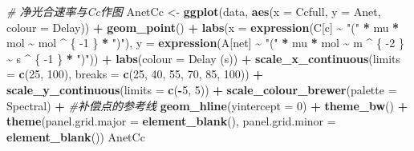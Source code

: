 \documentclass[
]{krantz}
\makeatletter
\newenvironment{Shaded}{\begin{snugshade}}{\end{snugshade}}
\newcommand{\CommentTok}[1]{\textcolor[rgb]{0.56,0.35,0.01}{\textit{#1}}}
\newcommand{\DataTypeTok}[1]{\textcolor[rgb]{0.13,0.29,0.53}{#1}}
\newcommand{\DecValTok}[1]{\textcolor[rgb]{0.00,0.00,0.81}{#1}}
\newcommand{\KeywordTok}[1]{\textcolor[rgb]{0.13,0.29,0.53}{\textbf{#1}}}
\newcommand{\NormalTok}[1]{#1}
\newcommand{\OperatorTok}[1]{\textcolor[rgb]{0.81,0.36,0.00}{\textbf{#1}}}
\newcommand{\StringTok}[1]{\textcolor[rgb]{0.31,0.60,0.02}{#1}}
\newenvironment{kframe}{%
\medskip{}
\setlength{\fboxsep}{.8em}
 \def\at@end@of@kframe{}%
 \ifinner\ifhmode%
  \def\at@end@of@kframe{\end{minipage}}%
  \begin{minipage}{\columnwidth}%
 \fi\fi%
 \def\FrameCommand##1{\hskip\@totalleftmargin \hskip-\fboxsep
 \colorbox{shadecolor}{##1}\hskip-\fboxsep
     \hskip-\linewidth \hskip-\@totalleftmargin \hskip\columnwidth}%
 \MakeFramed {\advance\hsize-\width
   \@totalleftmargin\z@ \linewidth\hsize
   \@setminipage}}%
 {\par\unskip\endMakeFramed%
 \at@end@of@kframe}
\renewenvironment{Shaded}{\begin{kframe}}{\end{kframe}}
\makeatother
\begin{document}
\begin{Shaded}
\begin{Highlighting}[]
\CommentTok{\# 净光合速率与Cc作图}
\NormalTok{AnetCc \textless{}{-}}\StringTok{ }\KeywordTok{ggplot}\NormalTok{(data, }\KeywordTok{aes}\NormalTok{(}\DataTypeTok{x =}\NormalTok{ Ccfull, }\DataTypeTok{y =}\NormalTok{ Anet, }\DataTypeTok{colour =}\NormalTok{ Delay)) }\OperatorTok{+}
\StringTok{  }\KeywordTok{geom\_point}\NormalTok{() }\OperatorTok{+}
\StringTok{  }\KeywordTok{labs}\NormalTok{(}\DataTypeTok{x =} \KeywordTok{expression}\NormalTok{(C[c] }\OperatorTok{\textasciitilde{}}\StringTok{ "("} \OperatorTok{*}\StringTok{ }\NormalTok{mu }\OperatorTok{*}\StringTok{ }\NormalTok{mol }\OperatorTok{\textasciitilde{}}\StringTok{ }\NormalTok{mol }\OperatorTok{\^{}}\StringTok{ }\NormalTok{\{}
    \DecValTok{{-}1}
\NormalTok{  \} }\OperatorTok{*}\StringTok{ ")"}\NormalTok{),}
  \DataTypeTok{y =} \KeywordTok{expression}\NormalTok{(A[net] }\OperatorTok{\textasciitilde{}}\StringTok{ "("} \OperatorTok{*}\StringTok{ }\NormalTok{mu }\OperatorTok{*}\StringTok{ }\NormalTok{mol }\OperatorTok{\textasciitilde{}}\StringTok{ }\NormalTok{m }\OperatorTok{\^{}}\StringTok{ }\NormalTok{\{}
    \DecValTok{{-}2}
\NormalTok{  \} }\OperatorTok{\textasciitilde{}}\StringTok{ }\NormalTok{s }\OperatorTok{\^{}}\StringTok{ }\NormalTok{\{}
    \DecValTok{{-}1}
\NormalTok{  \} }\OperatorTok{*}\StringTok{ ")"}\NormalTok{)) }\OperatorTok{+}
\StringTok{  }\KeywordTok{labs}\NormalTok{(}\DataTypeTok{colour =} \StringTok{\textquotesingle{}Delay (s)\textquotesingle{}}\NormalTok{) }\OperatorTok{+}
\StringTok{  }\KeywordTok{scale\_x\_continuous}\NormalTok{(}\DataTypeTok{limits =} \KeywordTok{c}\NormalTok{(}\DecValTok{25}\NormalTok{, }\DecValTok{100}\NormalTok{),}
                     \DataTypeTok{breaks =} \KeywordTok{c}\NormalTok{(}\DecValTok{25}\NormalTok{, }\DecValTok{40}\NormalTok{, }\DecValTok{55}\NormalTok{, }\DecValTok{70}\NormalTok{, }\DecValTok{85}\NormalTok{, }\DecValTok{100}\NormalTok{)) }\OperatorTok{+}
\StringTok{  }\KeywordTok{scale\_y\_continuous}\NormalTok{(}\DataTypeTok{limits =} \KeywordTok{c}\NormalTok{(}\OperatorTok{{-}}\DecValTok{5}\NormalTok{, }\DecValTok{5}\NormalTok{)) }\OperatorTok{+}
\StringTok{  }\KeywordTok{scale\_colour\_brewer}\NormalTok{(}\DataTypeTok{palette =} \StringTok{\textquotesingle{}Spectral\textquotesingle{}}\NormalTok{) }\OperatorTok{+}
\StringTok{  }\CommentTok{\#补偿点的参考线}
\StringTok{  }\KeywordTok{geom\_hline}\NormalTok{(}\DataTypeTok{yintercept =} \DecValTok{0}\NormalTok{) }\OperatorTok{+}
\StringTok{  }\KeywordTok{theme\_bw}\NormalTok{() }\OperatorTok{+}
\StringTok{  }\KeywordTok{theme}\NormalTok{(}\DataTypeTok{panel.grid.major =} \KeywordTok{element\_blank}\NormalTok{(),}
        \DataTypeTok{panel.grid.minor =} \KeywordTok{element\_blank}\NormalTok{())}
\NormalTok{AnetCc}
\end{Highlighting}
\end{Shaded}
\end{document}
